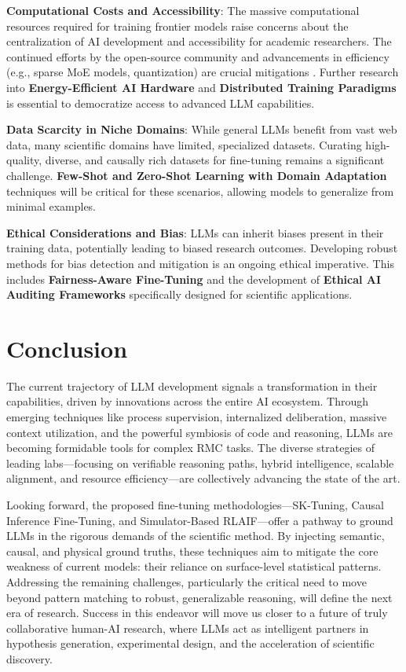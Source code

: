 \documentclass{article}
\begin{document}
\textbf{Computational Costs and Accessibility}: The massive computational resources required for training frontier models raise concerns about the centralization of AI development and accessibility for academic researchers. The continued efforts by the open-source community and advancements in efficiency (e.g., sparse MoE models, quantization) are crucial mitigations \cite{jiang2024mixtral}. Further research into \textbf{Energy-Efficient AI Hardware} and \textbf{Distributed Training Paradigms} is essential to democratize access to advanced LLM capabilities.

\textbf{Data Scarcity in Niche Domains}: While general LLMs benefit from vast web data, many scientific domains have limited, specialized datasets. Curating high-quality, diverse, and causally rich datasets for fine-tuning remains a significant challenge. \textbf{Few-Shot and Zero-Shot Learning with Domain Adaptation} techniques will be critical for these scenarios, allowing models to generalize from minimal examples.

\textbf{Ethical Considerations and Bias}: LLMs can inherit biases present in their training data, potentially leading to biased research outcomes. Developing robust methods for bias detection and mitigation is an ongoing ethical imperative. This includes \textbf{Fairness-Aware Fine-Tuning} and the development of \textbf{Ethical AI Auditing Frameworks} specifically designed for scientific applications.

\section{Conclusion}
The current trajectory of LLM development signals a transformation in their capabilities, driven by innovations across the entire AI ecosystem. Through emerging techniques like process supervision, internalized deliberation, massive context utilization, and the powerful symbiosis of code and reasoning, LLMs are becoming formidable tools for complex RMC tasks. The diverse strategies of leading labs—focusing on verifiable reasoning paths, hybrid intelligence, scalable alignment, and resource efficiency—are collectively advancing the state of the art.

Looking forward, the proposed fine-tuning methodologies—SK-Tuning, Causal Inference Fine-Tuning, and Simulator-Based RLAIF—offer a pathway to ground LLMs in the rigorous demands of the scientific method. By injecting semantic, causal, and physical ground truths, these techniques aim to mitigate the core weakness of current models: their reliance on surface-level statistical patterns. Addressing the remaining challenges, particularly the critical need to move beyond pattern matching to robust, generalizable reasoning, will define the next era of research. Success in this endeavor will move us closer to a future of truly collaborative human-AI research, where LLMs act as intelligent partners in hypothesis generation, experimental design, and the acceleration of scientific discovery.
\end{document}
